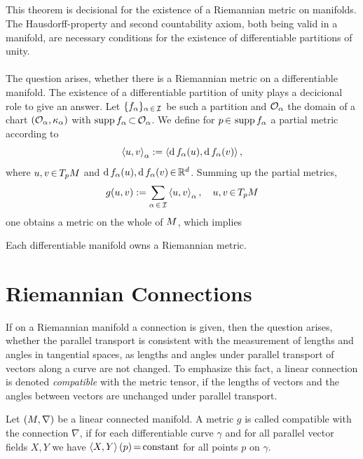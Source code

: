 \documentclass[11pt,twoside]{article}
\begin{document}
\subparagraph{}
This theorem is decisional for the existence of a Riemannian metric
on manifolds.
The Hausdorff-property and second countability axiom,
both being valid in a manifold,
are necessary conditions for the existence of differentiable
partitions of unity.

\paragraph{}
The question arises,
whether there is a Riemannian metric on a differentiable manifold.
The existence of a differentiable partition of unity plays a decicional role
to give an answer.
Let $\{f_{\alpha}\}_{\alpha {\,\in\,} \mathcal{I}}$ be such a partition
and $\mathcal{O}_{\alpha}$ the domain
of a chart $(\mathcal{O}_{\alpha},\kappa_{\alpha})$ with
$\operatorname{supp} f_{\alpha} {\,\subset\,} \mathcal{O}_{\alpha}$.
We define for $p {\,\in\,} \operatorname{supp} f_{\alpha}$ a partial metric
according to
\[
\left<u,v\right>_{\alpha} :=
\left<\operatorname{d}f_{\alpha}(u),\operatorname{d}f_{\alpha}(v)\right>,
\]
where $u,v {\,\in\,} T_p {M}$ and
$\operatorname{d}f_{\alpha}(u),\operatorname{d}f_{\alpha}(v) {\,\in\,} {\mathbb{R}}^d$.
Summing up the partial metrics,
\[
g(u,v) := \sum_{\alpha {\,\in\,} \mathcal{I}} \left<u,v\right>_{\alpha},
\quad u,v {\,\in\,} T_p {M}
\]
one obtains a metric on the whole of ${M}$, which implies

\begin{theorem}
Each differentiable manifold owns a Riemannian metric.
\end{theorem}

\section{Riemannian Connections}
If on a Riemannian manifold a connection is given,
then the question arises,
whether the parallel transport is consistent
with the measurement of lengths and angles in tangential spaces,
as lengths and angles under parallel transport of vectors along a curve
are not changed.
To emphasize this fact,
a linear connection is denoted \textit{compatible} with the metric tensor,
if the lengths of vectors and the angles between vectors are unchanged
under parallel transport.

\begin{definition}
Let $({M},\nabla)$ be a linear connected manifold.
A metric $g$ is called compatible with the connection $\nabla$,
if for each differentiable curve $\gamma$
and for all parallel vector fields $X,Y$ we have
$\left<X,Y\right>(p) {\,=\,} \mbox{constant}$
for all points $p$ on $\gamma$.
\end{definition}
\end{document}
